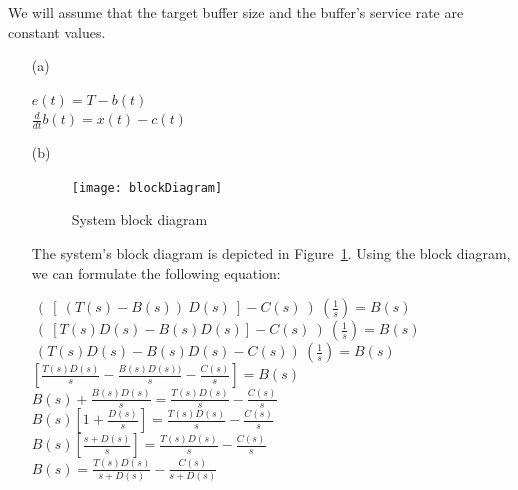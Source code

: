 \documentclass{article}
\begin{document}
\begin{enumerate}
\noindent We will assume that the target buffer size and the
buffer's service rate are constant values.


\bigbreak \bigbreak

\begin{itemize}

\item[(a)] \smallbreak

\noindent $e(t) = T - b(t)$\\
\noindent ${\frac{d}{dt}} b(t) = x(t) - c(t)$


\bigbreak \bigbreak

\item[(b)] \smallbreak

\begin{figure}[htp]
\centerline{
  \texttt{[image: blockDiagram]}
  }
   \caption{System block diagram}
   \label{fig:sol-block}
\end{figure}

\noindent The system's block diagram is depicted in Figure~\ref{fig:sol-block}.
Using the block diagram, we can formulate the following equation:
\bigbreak

\noindent $~( ~[ ~(T(s) - B(s)) ~D(s)~] - C(s)~) ~({\frac{1}{s}}) = B(s)$\\

\noindent $~( ~[T(s)D(s) - B(s)D(s)] - C(s)~) ~({\frac{1}{s}}) = B(s)$\\

\noindent $~(T(s)D(s) - B(s)D(s) - C(s)) ~({\frac{1}{s}}) = B(s)$\\

\noindent $[{\frac{T(s) D(s)}{s}} - {\frac{B(s) D(s))}{s}} -
{\frac{C(s)}{s}}] = B(s)$\\

\noindent $B(s) + {\frac{B(s) D(s)}{s}} = {\frac{T(s) D(s)}{s}} -
{\frac{C(s)}{s}}$\\

\noindent $B(s)[1 + {\frac{D(s)}{s}}] = {\frac{T(s) D(s)}{s}} -
{\frac{C(s)}{s}}$\\

\noindent $B(s)[{\frac{s + D(s)}{s}}] = {\frac{T(s) D(s)}{s}} -
{\frac{C(s)}{s}}$\\

\noindent $B(s) = {\frac{T(s) D(s)}{s + D(s)}} - {\frac{C(s)}{s +
D(s)}}$


\end{itemize}
\end{enumerate}
\end{document}
